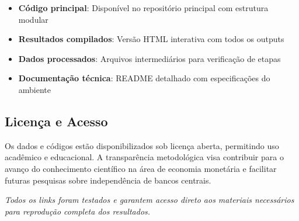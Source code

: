 \documentclass[a4paper,12pt]{article}
\begin{document}
\begin{itemize}
    \item \textbf{Código principal}: Disponível no repositório principal com estrutura modular
    \item \textbf{Resultados compilados}: Versão HTML interativa com todos os outputs
    \item \textbf{Dados processados}: Arquivos intermediários para verificação de etapas
    \item \textbf{Documentação técnica}: README detalhado com especificações do ambiente
\end{itemize}

\subsection*{Licença e Acesso}

Os dados e códigos estão disponibilizados sob licença aberta, permitindo uso acadêmico e educacional. A transparência metodológica visa contribuir para o avanço do conhecimento científico na área de economia monetária e facilitar futuras pesquisas sobre independência de bancos centrais.

\textit{Todos os links foram testados e garantem acesso direto aos materiais necessários para reprodução completa dos resultados.}
\end{document}
